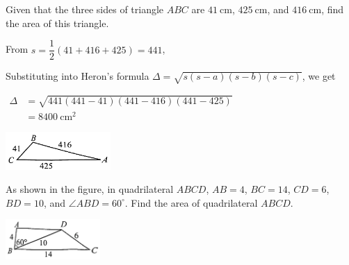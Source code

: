 \documentclass{report}
\begin{document}
    \begin{question}
        Given that the three sides of triangle $ABC$ are $41 \mathrm{~cm}$, $425 \mathrm{~cm}$, and $416 \mathrm{~cm}$, find the area of this triangle.

        \sol{}

        \begin{vwcol}[widths={0.6,0.4}, sep=8mm, rule=0pt,justify=flushleft]
            \noindent From $s=\dfrac{1}{2}(41+416+425)=441$,

        \noindent Substituting into Heron's formula $\Delta=\sqrt{s(s-a)(s-b)(s-c)}$, we get 
        
        \vspace{0.5em}
        \noindent $\begin{aligned} \Delta & =\sqrt{441(441-41)(441-416)(441-425)} \\ & =8400 \mathrm{~cm}^2\end{aligned}$

        \vspace{3em}
        
        \includegraphics[width=0.3\textwidth]{assets/10-43.jpg}
        \end{vwcol}
        \vspace{-1em}
    \end{question}

    \begin{vwcol}[widths={0.7,0.3}, sep=8mm, rule=0pt]
        As shown in the figure, in quadrilateral $ABCD$, $AB = 4$, $BC = 14$, $CD = 6$, $BD = 10$, and $\angle ABD = 60^\circ$. Find the area of quadrilateral $ABCD$.

        \includegraphics[width=0.27\textwidth]{assets/10-44.jpg}
    \end{vwcol}
\end{document}
